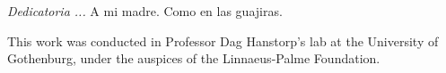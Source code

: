 \documentclass[letterpaper,12pt,oneside]{book}
\begin{document}
\begin{titlepage}
\begin{minipage}[c][0.81\textheight][t]{0.75\textwidth}
\begin{center}
{                \vspace{0.5cm}

                {\large\scshape Tutor:\\[0.3cm] {Remigio Cabrera Trujillo\\ 

                \vspace{0.5cm}

                \large{Ciudad Universitaria, CD. MX.,}{ }{2025}
            \end{center}
        \end{minipage}
    \end{titlepage}



\frontmatter

%
\begin{flushright}%
  \emph{Dedicatoria ...}
  \newline A mi madre. Como en las guajiras.
  \thispagestyle{empty}
\end{flushright}
\newpage
\vspace*{\fill}

\begin{center}
    This work was conducted in Professor Dag Hanstorp's lab at the University of Gothenburg, under the auspices of the Linnaeus-Palme Foundation.
\end{center}

\vspace*{\fill}
\chapter*{}
\end{document}
